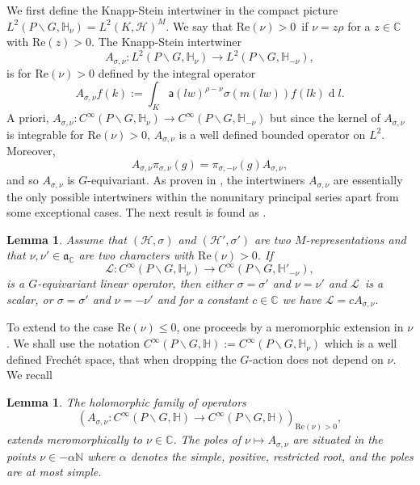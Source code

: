 \documentclass[a4paper,reqno]{amsart}
\numberwithin{equation}{section}
\def\rd{\operatorname{d}\!}
\def\C{\mathbb{C}}
\def\N{\mathbb{N}}
\newtheorem{lemma}[thm]{Lemma}
\theoremstyle{definition}
\theoremstyle{remark}
\begin{document}
We first define the Knapp-Stein intertwiner in the compact picture $L^2(P\backslash G,\mathbb{H}_\nu)=L^2(K,\mathcal{H})^M$. We say that $\mathrm{Re}(\nu)> 0$ if $\nu=z\rho$ for a $z\in \C$ with $\mathrm{Re}(z)> 0$. The Knapp-Stein intertwiner 
$$A_{\sigma,\nu}:L^2 (P\backslash G,\mathbb{H}_\nu)\to L^2(P\backslash G,\mathbb{H}_{-\nu}),$$
is for $\mathrm{Re}(\nu)> 0$ defined by the integral operator
$$A_{\sigma,\nu}f(k):=\int_K\mathsf{a}(lw)^{\rho-\nu}\sigma(m(lw))f(lk)\rd l.$$
A priori, $A_{\sigma,\nu}:C^\infty(P\backslash G,\mathbb{H}_\nu)\to C^\infty(P\backslash G,\mathbb{H}_{-\nu})$ but since the kernel of $A_{\sigma,\nu}$ is integrable for $\mathrm{Re}(\nu)> 0$, $A_{\sigma,\nu}$ is a well defined bounded operator on $L^2$. Moreover, 
$$A_{\sigma,\nu}\pi_{\sigma,\nu}(g)=\pi_{\sigma,-\nu}(g)A_{\sigma,\nu},$$
and so $A_{\sigma,\nu}$ is $G$-equivariant. As proven in \cite{knappstein}, the intertwiners $A_{\sigma,\nu}$ are essentially the only possible intertwiners within the nonunitary principal series apart from some exceptional cases. The next result is found as \cite[Lemma 21]{knappstein}. 




\begin{lemma}
Assume that $(\mathcal{H},\sigma)$ and $(\mathcal{H}',\sigma')$ are two $M$-representations and that $\nu,\nu'\in \mathfrak{a}_\C$ are two characters with $\mathrm{Re}(\nu)> 0$. If 
$$\mathcal{L}:C^\infty(P\backslash G,\mathbb{H}_\nu)\to C^\infty(P\backslash G,\mathbb{H}'_{-\nu}),$$
is a $G$-equivariant linear operator, then either $\sigma=\sigma'$ and $\nu=\nu'$ and $\mathcal{L}$ is a scalar, or $\sigma=\sigma'$ and $\nu=-\nu'$ and for a constant $c\in \C$ we have $\mathcal{L}=cA_{\sigma,\nu}$. 
\end{lemma}

To extend to the case $\mathrm{Re}(\nu)\leq 0$, one proceeds by a meromorphic extension in $\nu$. We shall use the notation $C^\infty(P\backslash G,\mathbb{H}):=C^\infty(P\backslash G,\mathbb{H}_\nu)$ which is a well defined Frech\'{e}t space, that when dropping the $G$-action does not depend on $\nu$.  We recall \cite[Theorem 3]{knappstein}

\begin{lemma}
The holomorphic family of operators 
$$(A_{\sigma,\nu}:C^\infty(P\backslash G,\mathbb{H})\to C^\infty(P\backslash G,\mathbb{H}))_{\mathrm{Re}(\nu)> 0},$$
extends meromorphically to $\nu \in \C$. The poles of $\nu\mapsto A_{\sigma,\nu}$ are situated in the points $\nu\in -\alpha \N$ where $\alpha$ denotes the simple, positive, restricted root, and the poles are at most simple. 
\end{lemma}
\end{document}
